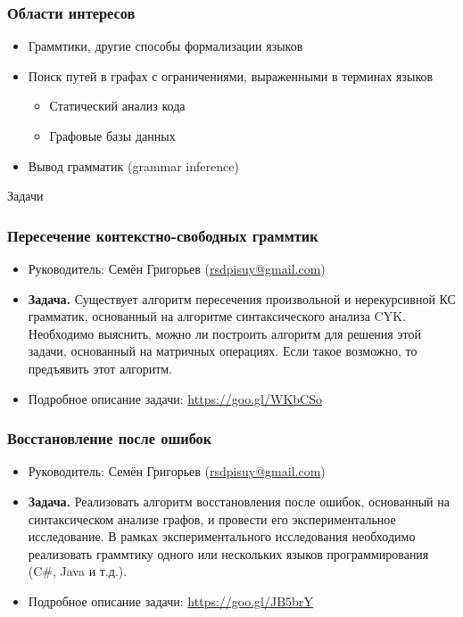\documentclass{beamer}
\begin{document}
\begin{frame}[fragile]
  \transwipe[direction=90]
  \frametitle{Области интересов}
  \begin{itemize}
    \item Граммтики, другие способы формализации языков
    \item Поиск путей в графах с ограничениями, выраженными в терминах языков
    \begin{itemize}
      \item Статический анализ кода
      \item Графовые базы данных
    \end{itemize}
    \item Вывод грамматик (grammar inference)
  \end{itemize}
\end{frame}

\begin{frame}[plain,c]
 \transwipe[direction=90]
 \begin{center}
  \Huge Задачи
 \end{center}
\end{frame}

\begin{frame}
  \transwipe[direction=90]
  \frametitle{Пересечение контекстно-свободных граммтик}
  \begin{itemize}
    \item Руководитель: Семён Григорьев (\url{rsdpisuy@gmail.com})
    \item \textbf{Задача.} Существует алгоритм пересечения произвольной и нерекурсивной КС грамматик, основанный на алгоритме синтаксического анализа CYK. 
    Необходимо выяснить, можно ли построить алгоритм для решения этой задачи, основанный на матричных операциях. Если такое возможно, то предъявить этот алгоритм.   
    \item Подробное описание задачи: \url{https://goo.gl/WKbCSo}
  \end{itemize}
\end{frame}

\begin{frame}
  \transwipe[direction=90]
  \frametitle{Восстановление после ошибок}
  \begin{itemize}
    \item Руководитель: Семён Григорьев (\url{rsdpisuy@gmail.com})
    \item \textbf{Задача.} Реализовать алгоритм восстановления после ошибок, основанный на синтаксическом анализе графов, и провести его экспериментальное исследование.
    В рамках экспериментального исследования необходимо реализовать граммтику одного или нескольких языков программирования (C\#, Java и т.д.).
    \item Подробное описание задачи: \url{https://goo.gl/JB5brY}
  \end{itemize}
\end{frame}
\end{document}
